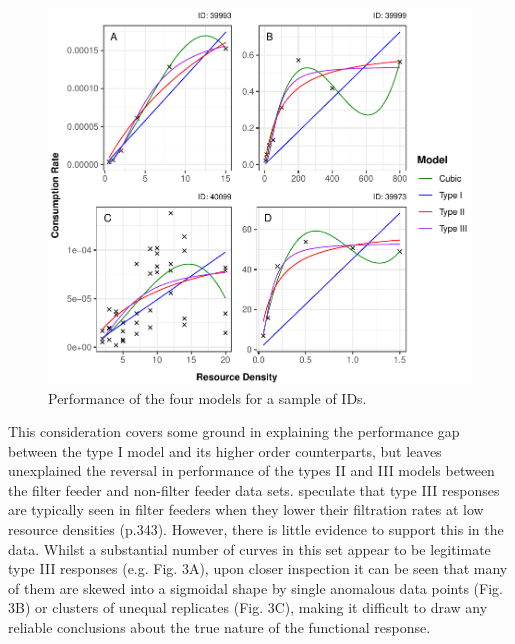 \documentclass[11pt]{article}
\begin{document}
    
    \begin{figure}[t!]
	    \centering\includegraphics[width=1\textwidth]{TypeIIIFilts.pdf}
	    \caption{Performance of the four models for a sample of IDs.}
    \end{figure}
    
    This consideration covers some ground in explaining the performance gap between the type I model and its higher order counterparts, but leaves unexplained the reversal in performance of the types II and III models between the filter feeder and non-filter feeder data sets. \citet{jeschke2004consumer} speculate that type III responses are typically seen in filter feeders when they lower their filtration rates at low resource densities (p.343). However, there is little evidence to support this in the data. Whilst a substantial number of curves in this set appear to be legitimate type III responses (e.g. Fig. 3A), upon closer inspection it can be seen that many of them are skewed into a sigmoidal shape by single anomalous data points (Fig. 3B) or clusters of unequal replicates (Fig. 3C), making it difficult to draw any reliable conclusions about the true nature of the functional response.
    
\end{document}
